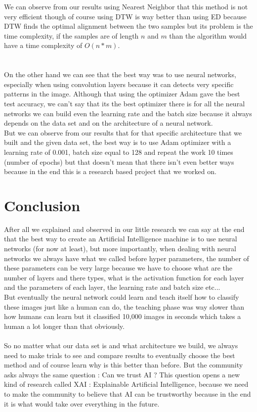 \documentclass[10pt,a4paper]{article}
\begin{document}
We can observe from our results using Nearest Neighbor that this method is not very efficient though of course using DTW is way better than using ED because DTW finds the optimal alignment between the two samples but its problem is the time complexity, if the samples are of length $ n $ and $ m $ than the algorithm would have a time complexity of $ O( n*m ) $.\\\\\\
On the other hand we can see that the best way was to use neural networks, especially when using convolution layers because it can detects very specific patterns in the image. Although that using the optimizer Adam gave the best test accuracy, we can't say that its the best optimizer there is for all the neural networks we can build even the learning rate and the batch size because it always depends on the data set and on the architecture of a neural network.\\
But we can observe from our results that for that specific architecture that we built and the given data set, the best way is to use Adam optimizer with a learning rate of 0.001, batch size equal to 128 and repeat the work 10 times (number of epochs) but that doesn't mean that there isn't even better ways because in the end this is a research based project that we worked on.

\section{Conclusion}

After all we explained and observed in our little research we can say at the end that the best way to create an Artificial Intelligence machine is to use neural networks (for now at least), but more importantly, when dealing with neural networks we always have what we called before hyper parameters, the number of these parameters can be very large because we have to choose what are the number of layers and there types, what is the activation function for each layer and the parameters of each layer, the learning rate and batch size etc...\\
But eventually the neural network could learn and teach itself how to classify these images just like a human can do, the teaching phase was way slower than how humans can learn but it classified 10,000 images in seconds which takes a human a lot longer than that obviously.\\\\
So no matter what our data set is and what architecture we build, we always need to make trials to see and compare results to eventually choose the best method and of course learn why is this better than before. But the community asks always the same question : Can we trust AI ? This question opens a new kind of research called XAI : Explainable Artificial Intelligence, because we need to make the community to believe that AI can be trustworthy because in the end it is what would take over everything in the future.
\end{document}
